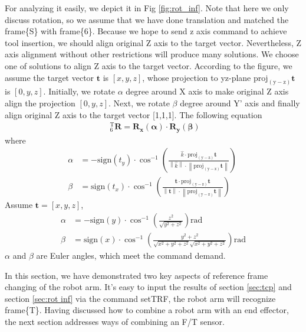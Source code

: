 For analyzing it easily, we depict it in Fig \ref{fig:rot_inf}. Note that here we only discuss rotation, so we assume that we have done translation and matched the frame\{S\} with frame\{6\}. Because we hope to send z axis command to achieve tool insertion, we should align original Z axis to the target vector. Nevertheless, Z axis alignment without other restrictions will produce many solutions. We choose one of solutions to align Z axis to the target vector. According to the figure, we assume the target vector $\boldsymbol{t}$ is $\left[x,y,z\right]$, whose projection to yz-plane $\mathrm{proj_{(y-z)}}\boldsymbol{t}$ is $\left[0,y,z\right]$. Initially, we rotate $\alpha$ degree around X axis to make original Z axis align the projection $\left[0,y,z\right]$. Next, we rotate $\beta$ degree around Y' axis and finally align original Z axis to the target vector [1,1,1]. The following equation 
\begin{equation}
\begin{split}
\ \  _{\mathrm{6}}^{\mathrm{T}}\mathbf{R} = \mathbf{R_x(\alpha)} \cdot \mathbf{R_y(\beta)}
\end{split}
\end{equation}
where
\begin{equation}
\begin{split}
\alpha &= 
-\mathrm{sign}(t_y)\cdot \cos^{-1} \left(  \frac{\hat{k}						\cdot 		\mathrm{proj_{(y-z)}}\boldsymbol{t}				}
								 				{\left \| \hat{k} \right \| 	\cdot \left \| \mathrm{proj_{(y-z)}}\boldsymbol{t} \right \|} \right)\ \\
\beta  &= 
\mathrm{sign}(t_x)\cdot \cos^{-1} \left( \frac{\textbf{t}							\cdot 		\mathrm{proj_{(y-z)}}\boldsymbol{t}			}
								  			  {\left \| \textbf{t}\right \| 	\cdot \left \| \mathrm{proj_{(y-z)}}\boldsymbol{t} \right \|} \right)\ 
\end{split}
\end{equation}
Assume $\boldsymbol{t} = [x,y,z]$,
\begin{equation}
\begin{split}
\alpha &= 
-\mathrm{sign}(y)\cdot \cos^{-1}	\left( \frac{z^2}{\sqrt{y^2+z^2}} \right) \mathrm{rad}\\
\beta  &= 
\mathrm{sign}(x)\cdot \cos^{-1} \left( \frac{y^2+z^2}{\sqrt{x^2+y^2+z^2}\sqrt{x^2+y^2+z^2}} \right) \mathrm{rad}
\end{split}
\end{equation}
$\alpha$ and $\beta$ are Euler angles, which meet the command demand.
\par
In this section, we have demonstrated two key aspects of reference frame changing of the robot arm. It's easy to input the results of section \ref{sec:tcp} and section \ref{sec:rot inf} via the command setTRF, the robot arm will recognize frame\{T\}. Having discussed how to combine a robot arm with an end effector, the next section addresses ways of combining an F/T sensor.